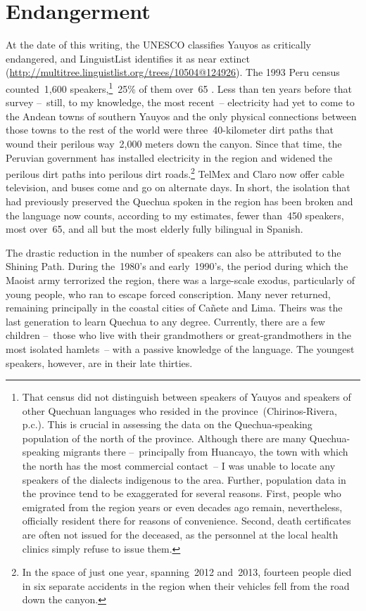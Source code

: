 \section{Endangerment}\label{sec:endangerment}
At the date of this writing, the UNESCO classifies Yauyos as critically endangered, and LinguistList identifies it as near extinct (\url{http://multitree.linguistlist.org/trees/10504@124926}). The 1993 Peru census counted~1,600 speakers,\footnote{That census did not distinguish between speakers of Yauyos and speakers of other Quechuan languages who resided in the province~(Chirinos-Rivera, p.c.). This is crucial in assessing the data on the Quechua-speaking population of the north of the province. Although there are many Quechua-speaking migrants there --~principally from Huancayo, the town with which the north has the most commercial contact~-- I was unable to locate any speakers of the dialects indigenous to the area. Further, population data in the province tend to be exaggerated for several reasons. First, people who emigrated from the region years or even decades ago remain, nevertheless, officially resident there for reasons of convenience. Second, death certificates are often not issued for the deceased, as the personnel at the local health clinics simply refuse to issue them.}~25\%{} of them over~65 \citep[121]{Chirinos01}. Less than ten years before that survey --~still, to my knowledge, the most recent~-- electricity had yet to come to the Andean towns of southern Yauyos and the only physical connections between those towns to the rest of the world were three~40-kilometer dirt paths that wound their perilous way~2,000 meters down the canyon. Since that time, the Peruvian government has installed electricity in the region and widened the perilous dirt paths into perilous dirt roads.\footnote{In the space of just one year, spanning~2012 and~2013, fourteen people died in six separate accidents in the region when their vehicles fell from the road down the canyon.} TelMex and Claro now offer cable television, and buses come and go on alternate days. In short, the isolation that had previously preserved the Quechua spoken in the region has been broken and the language now counts, according to my estimates, fewer than~450 speakers, most over~65, and all but the most elderly fully bilingual in Spanish. 

The drastic reduction in the number of speakers can also be attributed to the Shining Path. During the~1980’s and early~1990’s, the period during which the Maoist army terrorized the region, there was a large-scale exodus, particularly of young people, who ran to escape forced conscription. Many never returned, remaining principally in the coastal cities of Cañete and Lima. Theirs was the last generation to learn Quechua to any degree. Currently, there are a few children --~those who live with their grandmothers or great-grandmothers in the most isolated hamlets~-- with a passive knowledge of the language. The youngest speakers, however, are in their late thirties.

